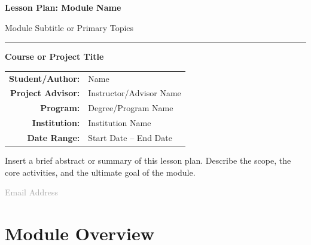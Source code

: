 \documentclass[11pt,letterpaper]{article}
\begin{document}
	
	\begin{titlepage}
		\centering
		\vspace*{2cm}
		
		{\Huge\bfseries\color{stevens} Lesson Plan: Module Name\par}
		\vspace{0.5cm}
		{\LARGE\color{darkgray} Module Subtitle or Primary Topics\par}
		
		\vspace{1.5cm}
		\rule{0.6\textwidth}{1pt}
		\vspace{1.5cm}
		
		{\Large\textbf{Course or Project Title}\par}
		
		\vspace{1.5cm}
		
		\begin{tabular}{rl}
			\textbf{Student/Author:}  & Name \\
			\textbf{Project Advisor:} & Instructor/Advisor Name \\
			\textbf{Program:}         & Degree/Program Name \\
			\textbf{Institution:}     & Institution Name \\
			\textbf{Date Range:}      & Start Date -- End Date \\
		\end{tabular}
		
		\vspace{2cm}
		
		\begin{tcolorbox}[colback=lightgray, colframe=darkgray, width=0.85\textwidth, arc=2pt]
			\centering\small
			Insert a brief abstract or summary of this lesson plan. Describe the scope, the core activities, and the ultimate goal of the module.
		\end{tcolorbox}
		
		\vfill
		{\small\textcolor{darkgray}{Email Address}}
	\end{titlepage}
	
	\tableofcontents
	\newpage
	
	\section{Module Overview}
	
\end{document}
